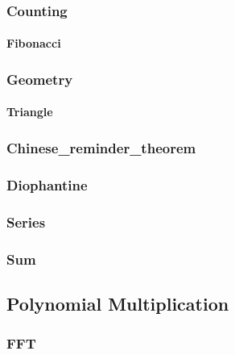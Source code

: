 \documentclass[10pt, landscape, a4paper,twosided]{extarticle}
\begin{document}
\begin{multicols}{3}
\subsubsection{Counting}
\paragraph{Fibonacci}

\subsubsection{Geometry}
\paragraph{Triangle}

\subsubsection{Chinese\_reminder\_theorem}

\subsubsection{Diophantine}

\subsubsection{Series}

\subsubsection{Sum}

\subsection{Polynomial Multiplication}
\subsubsection{FFT}

\end{multicols}
\end{document}
